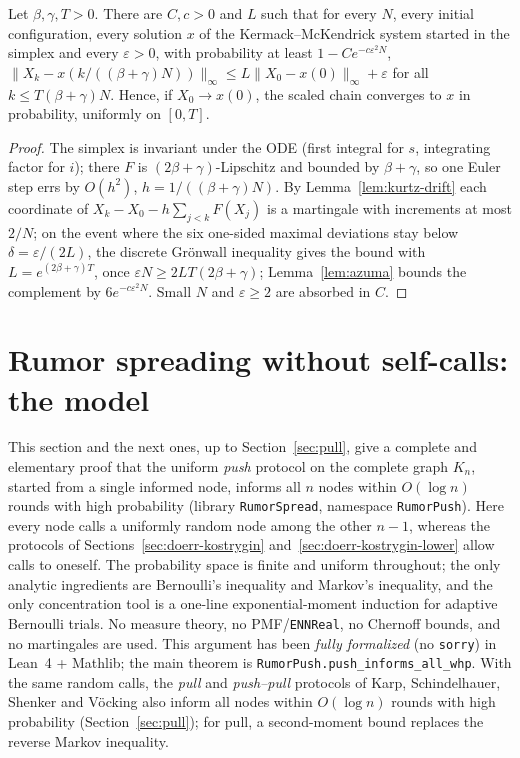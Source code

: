 \begin{theorem}\label{thm:kurtz}
\leanok{}
Let $\beta,\gamma,T>0$. There are $C,c>0$ and $L$ such that for every $N$, every initial
configuration, every solution $x$ of the Kermack--McKendrick system started in the simplex and
every $\varepsilon>0$, with probability at least $1-Ce^{-c\varepsilon^2N}$,
$\|X_k-x(k/((\beta+\gamma)N))\|_\infty\le L\|X_0-x(0)\|_\infty+\varepsilon$ for all
$k\le T(\beta+\gamma)N$. Hence, if $X_0\to x(0)$, the scaled chain converges to $x$ in probability,
uniformly on $[0,T]$.
\end{theorem}
\begin{proof}\leanok
The simplex is invariant under the ODE (first integral for $s$, integrating factor for $i$); there
$F$ is $(2\beta+\gamma)$-Lipschitz and bounded by $\beta+\gamma$, so one Euler step errs by
$O(h^2)$, $h=1/((\beta+\gamma)N)$. By Lemma~\ref{lem:kurtz-drift} each coordinate of
$X_k-X_0-h\sum_{j<k}F(X_j)$ is a martingale with increments at most $2/N$; on the event where the
six one-sided maximal deviations stay below $\delta=\varepsilon/(2L)$, the discrete Gr\"onwall
inequality gives the bound with $L=e^{(2\beta+\gamma)T}$, once $\varepsilon N\ge2LT(2\beta+\gamma)$;
Lemma~\ref{lem:azuma} bounds the complement by $6e^{-c\varepsilon^2N}$. Small $N$ and
$\varepsilon\ge2$ are absorbed in $C$.
\end{proof}

\section{Rumor spreading without self-calls: the model}\label{sec:model}

This section and the next ones, up to Section~\ref{sec:pull}, give a complete and elementary
proof that the uniform \emph{push} protocol on the complete graph $K_n$, started from a single
informed node, informs all $n$ nodes within $O(\log n)$ rounds with high probability (library
\texttt{RumorSpread}, namespace \texttt{RumorPush}). Here every node calls a uniformly random node
among the other $n-1$, whereas the protocols of Sections~\ref{sec:doerr-kostrygin}
and~\ref{sec:doerr-kostrygin-lower} allow calls to oneself. The probability space is finite and
uniform throughout; the only analytic ingredients are Bernoulli's inequality and Markov's
inequality, and the only concentration tool is a one-line exponential-moment induction for
adaptive Bernoulli trials. No measure theory, no PMF/\texttt{ENNReal}, no Chernoff bounds, and no
martingales are used. This argument has been \emph{fully formalized} (no \texttt{sorry}) in
Lean~4 + Mathlib; the main theorem is \texttt{RumorPush.push\_informs\_all\_whp}. With the same
random calls, the \emph{pull} and \emph{push--pull} protocols of Karp, Schindelhauer, Shenker and
V\"ocking also inform all nodes within $O(\log n)$ rounds with high probability
(Section~\ref{sec:pull}); for pull, a second-moment bound replaces the reverse Markov inequality.

